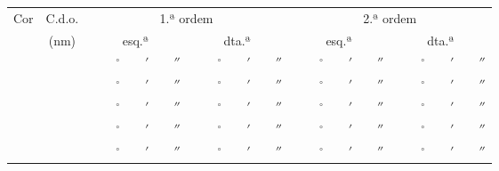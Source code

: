 \documentclass[a4paper,12pt]{article}  %
\begin{document}
\begin{center}
	\begin{tabular}{|c|c|c|c|c|c|}
	\hline
	 Cor &
	 C.d.o. &
	 \multicolumn{2}{|c|}{1.ª ordem} &
 	 \multicolumn{2}{|c|}{2.ª ordem} \\
	 &
	 (nm) &
	 esq.ª &
	 dta.ª &
	 esq.ª &
	 dta.ª \\
 	 \hline \hline
	
	
& & $\quad\quad^{\circ}\quad\quad'\quad\quad''$ & $\quad\quad^{\circ}\quad\quad'\quad\quad''$ & $\quad\quad^{\circ}\quad\quad'\quad\quad''$ & $\quad\quad^{\circ}\quad\quad'\quad\quad''$\\ \cline{1-6}
& & $\quad\quad^{\circ}\quad\quad'\quad\quad''$ & $\quad\quad^{\circ}\quad\quad'\quad\quad''$ & $\quad\quad^{\circ}\quad\quad'\quad\quad''$ & $\quad\quad^{\circ}\quad\quad'\quad\quad''$\\ \cline{1-6}
& & $\quad\quad^{\circ}\quad\quad'\quad\quad''$ & $\quad\quad^{\circ}\quad\quad'\quad\quad''$ & $\quad\quad^{\circ}\quad\quad'\quad\quad''$ & $\quad\quad^{\circ}\quad\quad'\quad\quad''$\\ \cline{1-6}
& & $\quad\quad^{\circ}\quad\quad'\quad\quad''$ & $\quad\quad^{\circ}\quad\quad'\quad\quad''$ & $\quad\quad^{\circ}\quad\quad'\quad\quad''$ & $\quad\quad^{\circ}\quad\quad'\quad\quad''$\\ \cline{1-6}
& & $\quad\quad^{\circ}\quad\quad'\quad\quad''$ & $\quad\quad^{\circ}\quad\quad'\quad\quad''$ & $\quad\quad^{\circ}\quad\quad'\quad\quad''$ & $\quad\quad^{\circ}\quad\quad'\quad\quad''$\\ \hline
	\end{tabular}
\end{center}


\end{document}
